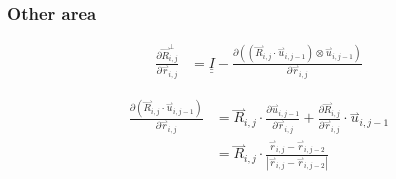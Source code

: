 \documentclass{article}
\renewcommand{\ij}{_{i,j}}
\newcommand{\ijj}{_{i,j-1}}
\newcommand{\ijk}{_{i,j-2}}
\newcommand{\ijjj}{_{i,j-2}}
\newcommand{\magn}[1]{\left\vert #1 \right\vert }
\renewcommand{\part}[2]{\frac{\partial #1 }{\partial #2}}
\newcommand{\partbig}[2]{\frac{\partial }{\partial #2}\left( #1 \right)}
\newcommand{\harp}{\overset{\rightharpoonup}}
\newcommand{\ten}[1]{\underline{\underline{#1}}}
\newcommand{\rij}{\harp r \ij}
\begin{document}
 \subsubsection{Other area}
\begin{align*}
  \label{eqn:Rperpri}
  \part{\harp R\ij ^ \bot}{\harp r\ij}  &=  \ten{I} 
  - \part{\left(\left(\harp R\ij \cdot \harp u \ijj \right) \otimes 
  \harp u \ijj \right)
  }{\harp r\ij}
\end{align*}

\begin{align*}
  \part{\left(\harp R\ij \cdot \harp u \ijj \right)}{\harp r\ij}   
  &= 
  \harp R\ij \cdot \part{\harp u \ijj}{\harp r \ij} + \part{\harp R \ij}{\harp r \ij} \cdot \harp u\ijj
  \\
  &= 
  \harp R\ij \cdot  \frac{\rij - \harp r\ijjj}{\magn{\harp r \ij - \harp r\ijk}}
\end{align*}




\end{document}
